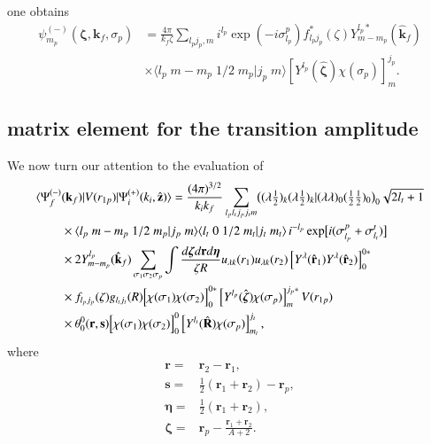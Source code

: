 one obtains
\begin{equation}\label{eq93}
\begin{split}
    \psi^{(-)}_{m_p}(\boldsymbol{\zeta},\mathbf{k}_f,\sigma_p)
    &=\frac{4\pi}{k_f\zeta}\sum_{l_pj_p,m}i^{l_p}
    \exp\left(-i\sigma_{l_p}^p\right)f_{l_pj_p}^*(\zeta)Y_{m-m_p}^{l_p*}
    (\hat{\mathbf{k}}_f)\\
    &\times \langle l_p \;m-m_p\;1/2\;m_p|j_p\;m\rangle \left[Y^{l_p}
    (\hat{\boldsymbol{\zeta}})\chi(\sigma_p)\right]^{j_p}_{m}.
\end{split}
\end{equation}
\subsection{matrix element for the transition amplitude}\label{C7SS722}
We now turn our attention to the evaluation of
\begin{equation}\label{eq94}
  \begin{split}
  \langle \Psi_f^{(-)}&(\mathbf{k}_f)|V(r_{1p})|\Psi_i^{(+)}(k_i,\hat {\mathbf{z}})\rangle=\frac{(4\pi)^{3/2}}{k_ik_f}\sum_{l_pl_tj_pj_tm}\bigl((\lambda \tfrac{1}{2})_k(\lambda \tfrac{1}{2})_k|(\lambda \lambda)_0(\tfrac{1}{2}\tfrac{1}{2})_0\bigr)_0\sqrt{2l_t+1}\\
  &\times \langle l_p \;m-m_p\;1/2\;m_p|j_p\;m\rangle\langle l_t \;0\;1/2\;m_t|j_t\;m_t\rangle\,i^{-l_p}\exp\bigl[i(\sigma_{l_p}^p+\sigma_{l_t}^t)\bigr]\\
  &\times 2 Y_{m-m_p}^{l_p}(\hat{\mathbf{k}}_f)\sum_{\sigma_1\sigma_2\sigma_p} \int \frac {d\boldsymbol{\zeta}d\mathbf{r}d\boldsymbol{\eta}}{\zeta R} u_{\lambda k}(r_1)u_{\lambda k}(r_2)\left[Y^{\lambda}(\hat{\mathbf{r}}_1)Y^{\lambda}(\hat{\mathbf{r}}_2)\right]^{0*}_{0}\\
  &\times f_{l_pj_p}(\zeta)g_{l_tj_t}(R)\Bigl[\chi(\sigma_1)\chi(\sigma_2)\Bigr]^{0*}_{0}\left[Y^{l_p}
    (\hat{\boldsymbol{\zeta}})\chi(\sigma_p)\right]^{j_p*}_{m} V(r_{1p}) \\
  &\times \theta_0^0(\mathbf{r},\mathbf{s}) \Bigl[\chi(\sigma_1)\chi(\sigma_2)\Bigr]^{0}_{0}\left[Y^{l_t}(\hat{\mathbf{R}})\chi(\sigma_p)\right]^{j_t}_{m_t},
  \end{split}
\end{equation}
where
\begin{equation}\label{eq95}
    \begin{split}
    \mathbf{r}=&\mathbf{r}_2-\mathbf{r}_1,  \\
    \mathbf{s}=&\frac{1}{2}\left(\mathbf{r}_1+\mathbf{r}_2\right)-\mathbf{r}_p,\\
    \boldsymbol{\eta}=&\frac{1}{2}\left(\mathbf{r}_1+\mathbf{r}_2\right),\\
    \boldsymbol{\zeta}=&\mathbf{r}_p-\frac{\mathbf{r}_1+\mathbf{r}_2}{A+2}.\\
    \end{split}
\end{equation}

